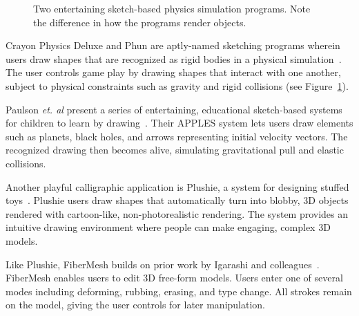 \begin{figure}
  \centering
  \caption{Two entertaining sketch-based physics simulation programs. Note the difference in how the programs render objects.}
  \label{fig:fun}
\end{figure}


Crayon Physics Deluxe and Phun are aptly-named sketching programs
wherein users draw shapes that are recognized as rigid bodies in a
physical simulation~\cite{crayon-physics-deluxe,ernerfeldt-phun}. The
user controls game play by drawing shapes that interact with one
another, subject to physical constraints such as gravity and rigid
collisions (see Figure~\ref{fig:fun}).

Paulson \textit{et. al} present a series of entertaining, educational
sketch-based systems for children to learn by
drawing~\cite{paulson-edu-sketch-games}. Their APPLES system lets
users draw elements such as planets, black holes, and arrows
representing initial velocity vectors. The recognized drawing then
becomes alive, simulating gravitational pull and elastic collisions.

Another playful calligraphic application is Plushie, a system for
designing stuffed toys~\cite{mori-plushie}. Plushie users draw shapes
that automatically turn into blobby, 3D objects rendered with
cartoon-like, non-photorealistic rendering. The system provides an
intuitive drawing environment where people can make engaging, complex
3D models.

Like Plushie, FiberMesh builds on prior work by Igarashi and
colleagues~\cite{nealen-fibermesh,igarashi-smooth}. FiberMesh enables
users to edit 3D free-form models. Users enter one of several modes
including deforming, rubbing, erasing, and type change. All strokes
remain on the model, giving the user controls for later manipulation.

